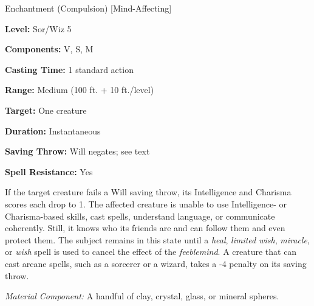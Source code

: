 
Enchantment (Compulsion) [Mind-Affecting]

\textbf{Level:} Sor/Wiz 5

\textbf{Components:} V, S, M

\textbf{Casting Time:} 1 standard action

\textbf{Range:} Medium (100 ft. + 10 ft./level)

\textbf{Target:} One creature

\textbf{Duration:} Instantaneous

\textbf{Saving Throw:} Will negates; see text

\textbf{Spell Resistance:} Yes

If the target creature fails a Will saving throw, its Intelligence and Charisma 
scores each drop to 1. The affected creature is unable to use Intelligence- or 
Charisma-based skills, cast spells, understand language, or communicate coherently. 
Still, it knows who its friends are and can follow them and even protect them. 
The subject remains in this state until a \textit{heal}, \textit{limited wish}, 
\textit{miracle}, or \textit{wish} spell is used to cancel the effect of the \textit{feeblemind}. 
A creature that can cast arcane spells, such as a sorcerer or a wizard, takes a 
-4 penalty on its saving throw.

\textit{Material Component:} A handful of clay, crystal, glass, or mineral spheres.

